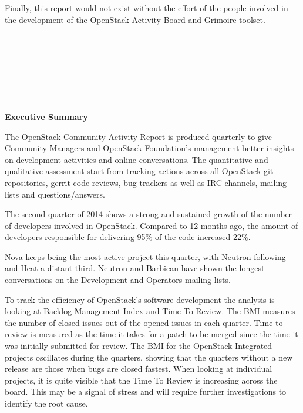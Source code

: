 \documentclass[a4wide,11pt]{report}
\begin{document}
~~\\
~~\\

Finally, this report would not exist without the effort of the people involved in the development of the \href{https://activity.openstack.org/dash}{OpenStack Activity Board} and \href{http://metricsgrimoire.github.io}{Grimoire toolset}.

~~\\
~~\\
~~\\
~~\\
~~\\
~~\\







\newpage

\begin{center}
\textbf{Executive Summary}
\end{center}

The OpenStack Community Activity Report is produced quarterly to give Community Managers and OpenStack Foundation's management better insights on development activities and online conversations. The  quantitative and qualitative assessment start from tracking actions across all OpenStack git repositories, gerrit code reviews, bug trackers as well as IRC channels, mailing lists and questions/answers.

The second quarter of 2014 shows a strong and sustained growth of the number of developers involved in OpenStack. Compared to 12 months ago, the amount of developers responsible for delivering 95\% of the code increased 22\%. 

Nova keeps being the most active project this quarter, with Neutron following and Heat a distant third. Neutron and Barbican have shown the longest conversations on the Development and Operators mailing lists.

To track the efficiency of OpenStack's software development the analysis is looking at Backlog Management Index and Time To Review. The BMI measures the number of closed issues out of the opened issues in each quarter. Time to review is measured as the time it takes for a patch to be merged since the time it was initially submitted for review. The BMI for the OpenStack Integrated projects oscillates during the quarters, showing that the quarters without a new release are those when bugs are closed fastest. When looking at individual projects, it is quite visible that the Time To Review is increasing across the board. This may be a signal of stress and will require further investigations to identify the root cause.
\end{document}
